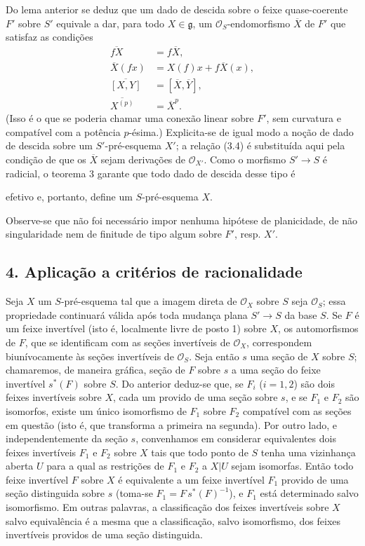 \documentclass[11pt,twoside,openany]{book}
\numberwithin{equation}{section}
\newcommand{\src}[1]{%
  \phantomsection\hypertarget{src:#1}{}%
  \marginpar{\raggedleft\footnotesize\sffamily #1}%
}
\theoremstyle{plain}
\theoremstyle{definition}
\theoremstyle{remark}
\newcommand{\FgaUnitKey}{frontmatter}
\renewcommand{\src}[1]{%
  \phantomsection\hypertarget{src:\FgaUnitKey:#1}{}%
  \marginpar{\raggedleft\footnotesize\sffamily #1}%
}
\begin{document}
Do lema anterior se deduz que um dado de descida sobre o feixe
quase-coerente $F'$ sobre $S'$ equivale a dar, para todo $X\in\mathfrak g$, um
$\mathcal O_S$-endomorfismo $\overline X$ de $F'$ que satisfaz as condições
\begin{align}
  \overline{fX}&=f\overline X, \tag{3.7}\\
  \overline X(fx)&=X(f)x+f\overline X(x), \tag{3.8}\\
  \overline{[X,Y]}&=[\overline X,\overline Y], \tag{3.9}\\
  \overline{X^{(p)}}&=\overline X^p. \tag{3.10}
\end{align}
(Isso é o que se poderia chamar uma conexão linear sobre $F'$, sem curvatura
e compatível com a potência $p$-ésima.) Explicita-se de igual modo a noção
de dado de descida sobre um $S'$-pré-esquema $X'$; a relação (3.4) é
substituída aqui pela condição de que os $\overline X$ sejam derivações de
$\mathcal O_{X'}$. Como o morfismo $S'\longrightarrow S$ é radicial, o
teorema 3 garante que todo dado de descida desse tipo é

\src{322}
efetivo e, portanto, define um $S$-pré-esquema $X$.

Observe-se que não foi necessário impor nenhuma hipótese de planicidade, de
não singularidade nem de finitude de tipo algum sobre $F'$, resp. $X'$.

\subsection*{4. Aplicação a critérios de racionalidade}

Seja $X$ um $S$-pré-esquema tal que a imagem direta de $\mathcal O_X$ sobre
$S$ seja $\mathcal O_S$; essa propriedade continuará válida após toda mudança
plana $S'\longrightarrow S$ da base $S$. Se $F$ é um feixe invertível
(isto é, localmente livre de posto 1) sobre $X$, os automorfismos de $F$, que se
identificam com as seções invertíveis de $\mathcal O_X$, correspondem
biunívocamente às seções invertíveis de $\mathcal O_S$. Seja então $s$
uma seção de $X$ sobre $S$; chamaremos, de maneira gráfica, seção de $F$
sobre $s$ a uma seção do feixe invertível $s^*(F)$ sobre $S$. Do anterior
deduz-se que, se $F_i$ ($i=1,2$) são dois feixes invertíveis sobre $X$, cada um
provido de uma seção sobre $s$, e se $F_1$ e $F_2$ são isomorfos, existe um
único isomorfismo de $F_1$ sobre $F_2$ compatível com as seções em questão
(isto é, que transforma a primeira na segunda). Por outro lado, e
independentemente da seção $s$, convenhamos em considerar equivalentes
dois feixes invertíveis $F_1$ e $F_2$ sobre $X$ tais que todo ponto de $S$ tenha
uma vizinhança aberta $U$ para a qual as restrições de $F_1$ e $F_2$ a
$X|U$ sejam isomorfas. Então todo feixe invertível $F$ sobre $X$ é equivalente
a um feixe invertível $F_1$ provido de uma seção distinguida sobre $s$
(toma-se $F_1=F\,s^*(F)^{-1}$), e $F_1$ está determinado salvo isomorfismo. Em
outras palavras, a classificação dos feixes invertíveis sobre $X$ salvo
equivalência é a mesma que a classificação, salvo isomorfismo, dos feixes
invertíveis providos de uma seção distinguida.
\end{document}
